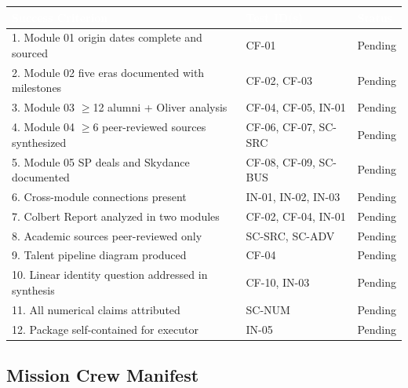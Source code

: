 \documentclass[11pt,letterpaper]{article}
\newcommand{\tableheader}[1]{\textbf{\sffamily\textcolor{white}{#1}}}
\begin{document}
\begin{center}
\begin{tabularx}{\textwidth}{XL{3.5cm}C{2cm}}
\toprule
{}
\tableheader{Success Criterion} & \tableheader{Test ID(s)} & \tableheader{Status} \\
. Module 01 origin dates complete and sourced & CF-01 & Pending \\
2. Module 02 five eras documented with milestones & CF-02, CF-03 & Pending \\
3. Module 03 $\geq$12 alumni + Oliver analysis & CF-04, CF-05, IN-01 & Pending \\
4. Module 04 $\geq$6 peer-reviewed sources synthesized & CF-06, CF-07, SC-SRC & Pending \\
5. Module 05 SP deals and Skydance documented & CF-08, CF-09, SC-BUS & Pending \\
6. Cross-module connections present & IN-01, IN-02, IN-03 & Pending \\
7. Colbert Report analyzed in two modules & CF-02, CF-04, IN-01 & Pending \\
8. Academic sources peer-reviewed only & SC-SRC, SC-ADV & Pending \\
9. Talent pipeline diagram produced & CF-04 & Pending \\
10. Linear identity question addressed in synthesis & CF-10, IN-03 & Pending \\
11. All numerical claims attributed & SC-NUM & Pending \\
12. Package self-contained for executor & IN-05 & Pending \\
\bottomrule
\end{tabularx}
\end{center}

\subsection{Mission Crew Manifest}
\end{document}
